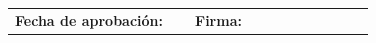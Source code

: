 \begin{titlepage}
\begin{flushleft}
    \vspace{0.8cm}

    \begin{tabular}{@{}p{0.45\linewidth} p{0.45\linewidth}@{}}
        \textbf{Fecha de aprobación:} \hrulefill & \textbf{Firma:} \hrulefill \\
    \end{tabular}
    \end{flushleft}

    \vspace{0.5cm}
\end{titlepage}

